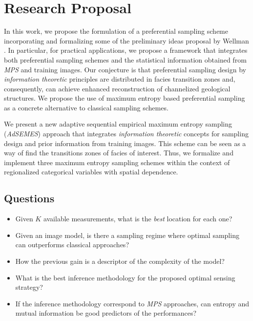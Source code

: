\chapter{Research Proposal}

In this work, we propose the formulation of a preferential sampling scheme incorporating and formalizing some of the preliminary ideas proposal by Wellman \cite{wellmann2013information}. In particular, for practical applications, we propose a framework that integrates both preferential sampling schemes and the statistical information obtained from \emph{MPS} and training images. Our conjecture is that preferential sampling design by \emph{information theoretic} principles are distributed in facies transition zones and, consequently, can achieve enhanced reconstruction of channelized geological structures. We propose the use of maximum entropy based preferential sampling as a concrete alternative to classical sampling schemes.  

We present a new adaptive sequential empirical maximum entropy sampling (\emph{AdSEMES}) approach that integrates \emph{information theoretic} concepts for sampling design and prior information from training images. This scheme can be seen as a way of find the transitions zones of facies of interest. Thus, we formalize and implement three maximum entropy sampling schemes within the context of regionalized categorical variables with spatial dependence.


\section{Questions}

\begin{itemize}
	\item Given $K$ available measurements, what is the \emph{best} location for each one?
	\item Given an image model, is there a sampling regime where optimal sampling can outperforms classical approaches?
	\item How the previous gain is a descriptor of the complexity of the model?
	\item What is the best inference methodology for the proposed optimal sensing strategy?
	\item If the inference methodology correspond to \emph{MPS} approaches, can entropy and mutual information be good predictors of the performances?
\end{itemize}



